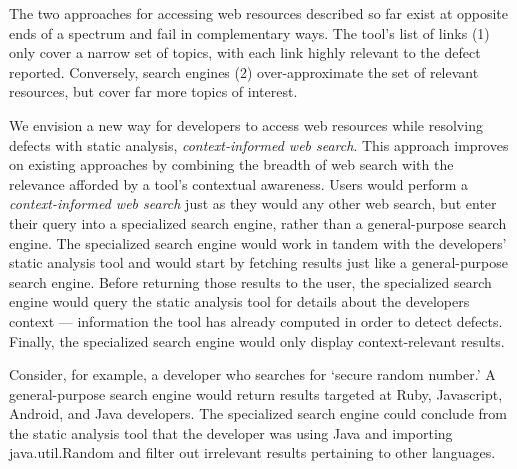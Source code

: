 \documentclass[10pt,journal,compsoc]{IEEEtran}
\begin{document}
The two approaches for accessing web resources described so far exist at opposite ends of a spectrum and fail in complementary ways. 
The tool's list of links (1) only cover a narrow set of topics, with each link highly relevant to the defect reported. 
Conversely, search engines (2) over-approximate the set of relevant resources, but cover far more topics of interest. 

We envision a new way for developers to access web resources while resolving defects with static analysis, \textit{context-informed web search}. This approach improves on existing approaches by combining the breadth of web search with the relevance afforded by a tool's contextual awareness.
Users would perform a \textit{context-informed web search} just as they would any other web search, but enter their query into a specialized search engine, rather than a general-purpose search engine.
The specialized search engine would work in tandem with the developers' static analysis tool and would start by fetching results just like a general-purpose search engine.
Before returning those results to the user, the specialized search engine would query the static analysis tool for details about the developers context --- information the tool has already computed in order to detect defects.
Finally, the specialized search engine would only display context-relevant results.

Consider, for example, a developer who searches for `secure random number.'
A general-purpose search engine would return results targeted at Ruby, Javascript, Android, and Java developers.
The specialized search engine could conclude from the static analysis tool that the developer was using Java and importing java.util.Random and filter out irrelevant results pertaining to other languages.


\end{document}
